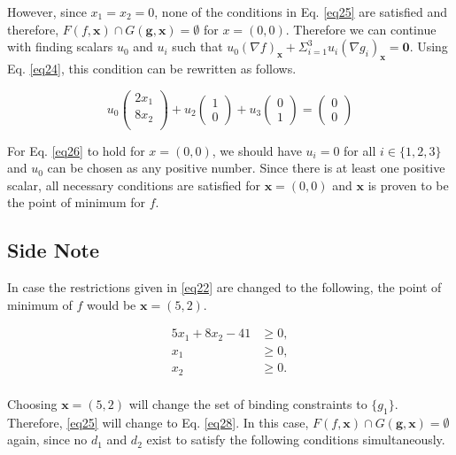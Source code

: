 However, since $x_1 = x_2 = 0$, none of the conditions in Eq. \ref{eq25} are satisfied and therefore, $F(f,\mathbf{x}) \cap G(\mathbf{g}, \mathbf{x}) = \emptyset$ for $x = (0,0)$.
Therefore we can continue with finding scalars $u_0$ and $u_i$ such that $u_0(\nabla f)_\mathbf{x} + \Sigma_{i=1}^{3} u_i (\nabla g_i)_\mathbf{x} = \mathbf{0}$.
Using Eq. \ref{eq24}, this condition can be rewritten as follows.

\begin{equation}
u_0 \begin{pmatrix} 2x_1\\ 8x_2\\ \end{pmatrix} + u_2 \begin{pmatrix} 1\\ 0\end{pmatrix} + u_3 \begin{pmatrix} 0\\ 1\end{pmatrix} = \begin{pmatrix}
0 \\ 0 \end{pmatrix}
\label{eq26}
\end{equation}

For Eq. \ref{eq26} to hold for $x = (0, 0)$, we should have $u_i = 0$ for all $i\in \{1,2,3\}$ and $u_0$ can be chosen as any positive number.
Since there is at least one positive scalar, all necessary conditions are satisfied for $\mathbf{x} = (0, 0)$ and $\mathbf{x}$ is proven to be the point of minimum for $f$.

\subsection*{Side Note}

In case the restrictions given in \ref{eq22} are changed to the following, the point of minimum of $f$ would be $\mathbf{x} = (5,2)$.

\begin{equation}
\begin{aligned}
5x_1 + 8x_2 - 41 &\geqslant 0,\\
x_1 &\geqslant 0,\\
x_2 &\geqslant 0.\\
\end{aligned}
\label{eq27}
\end{equation}

Choosing $\mathbf{x} = (5,2)$ will change the set of binding constraints to $\{g_1\}$.
Therefore, \ref{eq25} will change to Eq. \ref{eq28}.
In this case, $F(f,\mathbf{x}) \cap G(\mathbf{g}, \mathbf{x}) = \emptyset$ again, since no $d_1$ and $d_2$ exist to satisfy the following conditions simultaneously.

